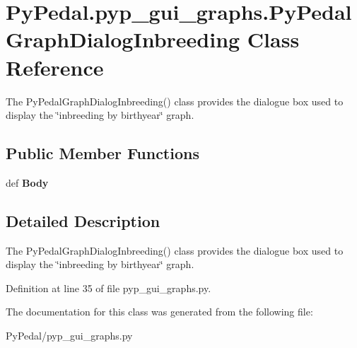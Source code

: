 \hypertarget{classPyPedal_1_1pyp__gui__graphs_1_1PyPedalGraphDialogInbreeding}{
\section{PyPedal.pyp\_\-gui\_\-graphs.PyPedalGraphDialogInbreeding Class Reference}
\label{classPyPedal_1_1pyp__gui__graphs_1_1PyPedalGraphDialogInbreeding}
}


The PyPedalGraphDialogInbreeding() class provides the dialogue box used to display the \char`\"{}inbreeding by birthyear\char`\"{} graph.  


\subsection*{Public Member Functions}
\begin{DoxyCompactItemize}
\item 
\hypertarget{classPyPedal_1_1pyp__gui__graphs_1_1PyPedalGraphDialogInbreeding_a1375101a93d8a11235ff301914542a52}{
def {\bfseries Body}}
\label{classPyPedal_1_1pyp__gui__graphs_1_1PyPedalGraphDialogInbreeding_a1375101a93d8a11235ff301914542a52}

\end{DoxyCompactItemize}


\subsection{Detailed Description}
The PyPedalGraphDialogInbreeding() class provides the dialogue box used to display the \char`\"{}inbreeding by birthyear\char`\"{} graph. 



Definition at line 35 of file pyp\_\-gui\_\-graphs.py.



The documentation for this class was generated from the following file:\begin{DoxyCompactItemize}
\item 
PyPedal/pyp\_\-gui\_\-graphs.py\end{DoxyCompactItemize}

